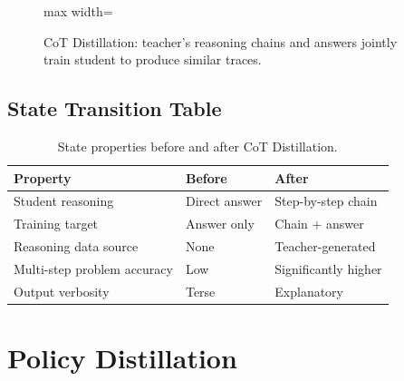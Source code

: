 \begin{figure}[h]
\centering
\begin{adjustbox}{max width=\linewidth}
\end{adjustbox}
\caption{CoT Distillation: teacher's reasoning chains and answers jointly train student to produce similar traces.}
\end{figure}

\subsection{State Transition Table}
\begin{table}[h]\centering
\begin{tabular}{lll}\toprule
\textbf{Property} & \textbf{Before} & \textbf{After}\\\midrule
Student reasoning & Direct answer & Step-by-step chain\\
Training target & Answer only & Chain + answer\\
Reasoning data source & None & Teacher-generated\\
Multi-step problem accuracy & Low & Significantly higher\\
Output verbosity & Terse & Explanatory\\\bottomrule
\end{tabular}
\caption{State properties before and after CoT Distillation.}
\end{table}

\newpage
\section{Policy Distillation}

